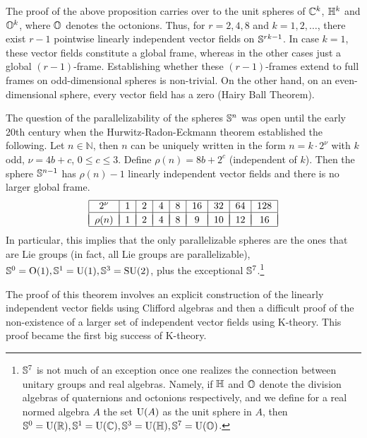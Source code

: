 \begin{rem}
    The proof of the above proposition carries over to the unit spheres of $\mathbb{C}^k$, $\mathbb{H}^k$ and $\mathbb{O}^k$, where $\mathbb{O}$ denotes the octonions. Thus, for $r=2,4,8$ and $k=1,2,\ldots$, there exist $r-1$ pointwise linearly independent vector fields on $\mathbb{S}^{rk-1}$. In case $k=1$, these vector fields constitute a global frame, whereas in the other cases just a global $(r-1)$-frame. Establishing whether these $(r-1)$-frames extend to full frames on odd-dimensional spheres is non-trivial. On the other hand, on an even-dimensional sphere, every vector field has a zero (Hairy Ball Theorem).

    The question of the parallelizability of the spheres $\mathbb{S}^n$ was open until the early 20th century when the Hurwitz-Radon-Eckmann theorem established the following. Let $n\in\mathbb{N}$, then $n$ can be uniquely written in the form $n=k\cdot 2^\nu$ with $k$ odd, $\nu=4b+c$, $0\leq c\leq 3$. Define $\rho(n)=8b+2^c$ (independent of $k$). Then the sphere $\mathbb{S}^{n-1}$ has $\rho(n)-1$ linearly independent vector fields and there is no larger global frame. 
    \[\begin{tabular}{|c|c|c|c|c|c|c|c|c|}
    \hline 
    $2^\nu$ & 1 & 2 & 4 & 8 & 16 & 32 & 64 & 128\tabularnewline
    \hline &&&&&&&&\\[-1em]
    $\rho(n)$ &1 & 2 & 4 & 8 & 9 & 10 & 12 & 16\tabularnewline
    \hline 
    \end{tabular}\]
    In particular, this implies that the only parallelizable spheres are the ones that are Lie groups (in fact, all Lie groups are parallelizable), $\mathbb{S}^0=\rm{O}(1),\mathbb{S}^1=\rm{U}(1),\mathbb{S}^3=\rm{SU}(2)$, plus the exceptional $\mathbb{S}^7$.\footnote{$\mathbb{S}^7$ is not much of an exception once one realizes the connection between unitary groups and real algebras. Namely, if $\mathbb{H} $ and $\mathbb{O}$ denote the division algebras of quaternions and octonions respectively, and we define for a real normed algebra $A$ the set ${\rm U}(A)$ as the unit sphere in $A$, then $\mathbb{S}^0=\rm{U}(\mathbb{R} ),\mathbb{S}^1=\rm{U}(\mathbb{C}),\mathbb{S}^3=\rm{U}(\mathbb{H}),\mathbb{S}^7=\rm{U}(\mathbb{O})$.}
    
    The proof of this theorem involves an explicit construction of the linearly independent vector fields using Clifford algebras and then a difficult proof of the non-existence of a larger set of independent vector fields using K-theory. This proof became the first big success of K-theory.
\end{rem}



